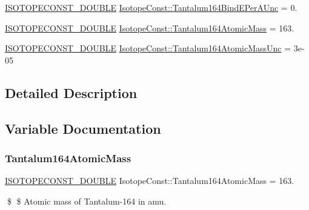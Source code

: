 \begin{DoxyCompactItemize}
\mbox{\hyperlink{group___isotope_const-_macros_ga8f45a7272ce02c0b4c65c44636ed719a}{I\+S\+O\+T\+O\+P\+E\+C\+O\+N\+S\+T\+\_\+\+D\+O\+U\+B\+LE}} \mbox{\hyperlink{group___isotope_const-_tantalum-_ta164_ga753bbc502ea843185d66e955707fa9b5}{Isotope\+Const\+::\+Tantalum164\+Bind\+E\+Per\+A\+Unc}} = 0.
\item 
\mbox{\hyperlink{group___isotope_const-_macros_ga8f45a7272ce02c0b4c65c44636ed719a}{I\+S\+O\+T\+O\+P\+E\+C\+O\+N\+S\+T\+\_\+\+D\+O\+U\+B\+LE}} \mbox{\hyperlink{group___isotope_const-_tantalum-_ta164_gaac065fb757c9bb9067bf946c3947ffe0}{Isotope\+Const\+::\+Tantalum164\+Atomic\+Mass}} = 163.
\item 
\mbox{\hyperlink{group___isotope_const-_macros_ga8f45a7272ce02c0b4c65c44636ed719a}{I\+S\+O\+T\+O\+P\+E\+C\+O\+N\+S\+T\+\_\+\+D\+O\+U\+B\+LE}} \mbox{\hyperlink{group___isotope_const-_tantalum-_ta164_gaec853201aab0147a9728646f1893f5af}{Isotope\+Const\+::\+Tantalum164\+Atomic\+Mass\+Unc}} = 3e-\/05
\end{DoxyCompactItemize}


\subsection{Detailed Description}


\subsection{Variable Documentation}
\mbox{\label{group___isotope_const-_tantalum-_ta164_gaac065fb757c9bb9067bf946c3947ffe0}} 
\subsubsection{\texorpdfstring{Tantalum164\+Atomic\+Mass}{Tantalum164AtomicMass}}
{\footnotesize\ttfamily \mbox{\hyperlink{group___isotope_const-_macros_ga8f45a7272ce02c0b4c65c44636ed719a}{I\+S\+O\+T\+O\+P\+E\+C\+O\+N\+S\+T\+\_\+\+D\+O\+U\+B\+LE}} Isotope\+Const\+::\+Tantalum164\+Atomic\+Mass = 163.}

\$ \$ Atomic mass of Tantalum-\/164 in amu. \mbox{\label{group___isotope_const-_tantalum-_ta164_gaec853201aab0147a9728646f1893f5af}} 
